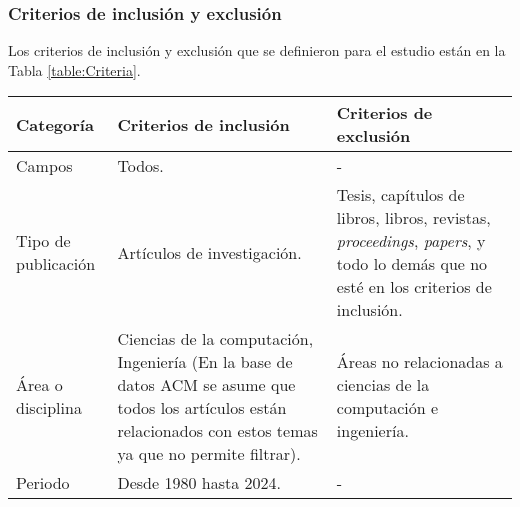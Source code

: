 \subsubsection{Criterios de inclusión y exclusión}
Los criterios de inclusión y exclusión que se definieron para el estudio están en la Tabla \ref{table:Criteria}.

\begin{table*}[htbp]

	\centering
	\renewcommand{\arraystretch}{1.7}  %
	\setlength{\tabcolsep}{3pt}      %
	\vspace{10pt}                     %
	\begin{tabularx}{\textwidth}{|>{\arraybackslash}m{2.3cm}|>{\arraybackslash}X|>{\arraybackslash}X|}
		\hline
		\textbf{Categoría}  & \textbf{Criterios de inclusión}                                                                                                                                 & \textbf{Criterios de exclusión}                                                                                                                 \\
		\hline
		Campos              & Todos.                                                                                                                                                          & -                                                                                                                                               \\
		\hline
		Tipo de publicación & Artículos de investigación.                                                                                                                                     & Tesis, capítulos de libros, libros, revistas, \textit{proceedings}, \textit{papers}, y todo lo demás que no esté en los criterios de inclusión. \\
		\hline
		Área o disciplina   & Ciencias de la computación, Ingeniería (En la base de datos ACM se asume que todos los artículos están relacionados con estos temas ya que no permite filtrar). & Áreas no relacionadas a ciencias de la computación e ingeniería.                                                                                \\
		\hline
		Periodo             & Desde 1980 hasta 2024.                                                                                                                                          & -                                                                                                                                               \\

\end{tabularx}
\end{table*}
